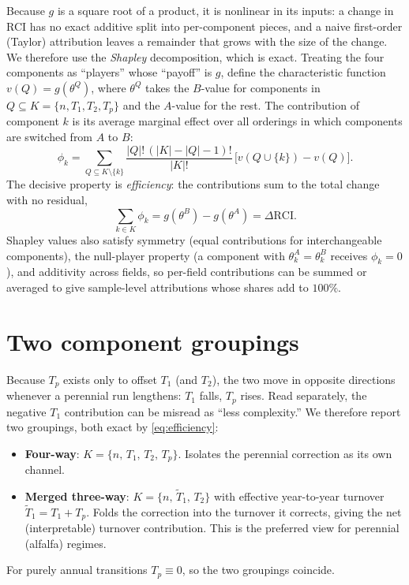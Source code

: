 \documentclass[11pt]{article}
\newcommand{\RCI}{\mathrm{RCI}}
\begin{document}
Because $g$ is a square root of a product, it is nonlinear in its inputs: a
change in RCI has no exact additive split into per-component pieces, and a naive
first-order (Taylor) attribution leaves a remainder that grows with the size of
the change. We therefore use the \emph{Shapley} decomposition, which is exact.
Treating the four components as ``players'' whose ``payoff'' is $g$, define the
characteristic function $v(Q)=g(\theta^{Q})$, where $\theta^{Q}$ takes the
$B$-value for components in $Q\subseteq K=\{n,T_1,T_2,T_p\}$ and the $A$-value for
the rest. The contribution of component $k$ is its average marginal effect over
all orderings in which components are switched from $A$ to $B$:
\begin{equation}
\phi_k=\!\!\sum_{Q\subseteq K\setminus\{k\}}
\frac{|Q|!\,(|K|-|Q|-1)!}{|K|!}\,
\bigl[v(Q\cup\{k\})-v(Q)\bigr].
\label{eq:shapley}
\end{equation}
The decisive property is \emph{efficiency}: the contributions sum to the total
change with no residual,
\begin{equation}
\sum_{k\in K}\phi_k=g(\theta^B)-g(\theta^A)=\Delta\RCI .
\label{eq:efficiency}
\end{equation}
Shapley values also satisfy symmetry (equal contributions for
interchangeable components), the null-player property (a component with
$\theta_k^A=\theta_k^B$ receives $\phi_k=0$), and additivity across fields, so
per-field contributions can be summed or averaged to give sample-level
attributions whose shares add to $100\%$.

\section{Two component groupings}

Because $T_p$ exists only to offset $T_1$ (and $T_2$), the two move in opposite
directions whenever a perennial run lengthens: $T_1$ falls, $T_p$ rises. Read
separately, the negative $T_1$ contribution can be misread as ``less
complexity.'' We therefore report two groupings, both exact by
\eqref{eq:efficiency}:
\begin{itemize}
\item[(i)] \textbf{Four-way}: $K=\{n,\,T_1,\,T_2,\,T_p\}$. Isolates the perennial
correction as its own channel.
\item[(ii)] \textbf{Merged three-way}: $K=\{n,\,\tilde T_1,\,T_2\}$ with effective
year-to-year turnover $\tilde T_1=T_1+T_p$. Folds the correction into the
turnover it corrects, giving the net (interpretable) turnover contribution. This
is the preferred view for perennial (alfalfa) regimes.
\end{itemize}
For purely annual transitions $T_p\equiv0$, so the two groupings coincide.
\end{document}

